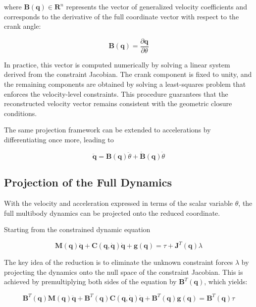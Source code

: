 where $\textbf{B}(\textbf{q}) \in \textbf{R}^n$ represents the vector of generalized velocity coefficients and corresponds to the derivative of the full coordinate vector with respect to the crank angle:

\begin{equation}
\textbf{B}(\textbf{q}) = \frac{\partial \textbf{q}}{\partial \theta}
\end{equation}  

In practice, this vector is computed numerically by solving a linear system derived from the constraint Jacobian. The crank component is fixed to unity, and the remaining components are obtained by solving a least-squares problem that enforces the velocity-level constraints. This procedure guarantees that the reconstructed velocity vector remains consistent with the geometric closure conditions.

The same projection framework can be extended to accelerations by differentiating once more, leading to

\begin{equation}
\ddot{\textbf{q}} = \textbf{B}(\textbf{q})\ddot{\theta} + \dot{\textbf{B}}(\textbf{q})\dot{\theta}
\end{equation}

\subsection{Projection of the Full Dynamics}
With the velocity and acceleration expressed in terms of the scalar variable $\theta$, the full multibody dynamics can be projected onto the reduced coordinate. 

Starting from the constrained dynamic equation

\begin{equation}
\textbf{M}(\textbf{q})\ddot{\textbf{q}} +
\textbf{C}(\textbf{q},\dot{\textbf{q}})\dot{\textbf{q}} +
\textbf{g}(\textbf{q}) 
= \tau + \textbf{J}^T(\textbf{q})\lambda
\end{equation}  

The key idea of the reduction is to eliminate the unknown constraint forces $\lambda$ by projecting the dynamics onto the null space of the constraint Jacobian. This is achieved by premultiplying both sides of the equation by $\textbf{B}^T(\textbf{q})$, which yields:

\begin{equation}
\textbf{B}^T(\textbf{q})\textbf{M}(\textbf{q})\ddot{\textbf{q}} +
\textbf{B}^T(\textbf{q})\textbf{C}(\textbf{q},\dot{\textbf{q}})\dot{\textbf{q}} +
\textbf{B}^T(\textbf{q})\textbf{g}(\textbf{q})
= \textbf{B}^T(\textbf{q})\tau  
\end{equation}

